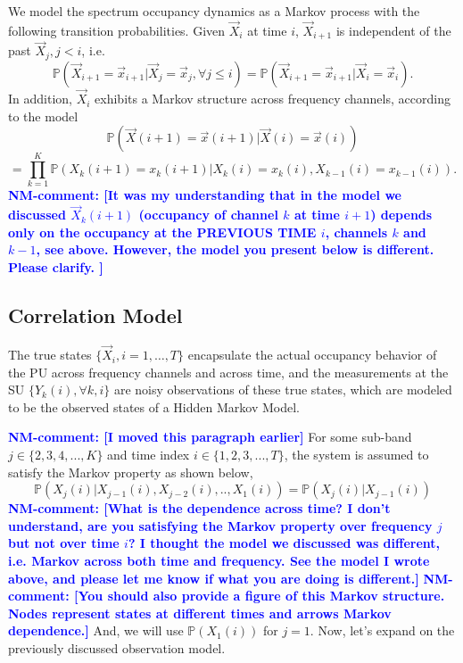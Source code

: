 \documentclass[conference]{IEEEtran}
\newcommand{\nm}[1]{\textcolor{blue}{\textbf{NM-comment: [#1]}}}
\newcommand{\add}[1]{{\color{red}#1}}
\begin{document}
\add{We model the spectrum occupancy dynamics as a Markov process with the following transition probabilities. Given $\vec{X}_i$ at time $i$, $\vec{X}_{i+1}$ is independent of the past $\vec{X}_j,j<i$, i.e.
$$\mathbb P(\vec{X}_{i+1}=\vec{x}_{i+1}|\vec{X}_{j}=\vec{x}_{j},\forall j\leq i)
=
\mathbb P(\vec{X}_{i+1}=\vec{x}_{i+1}|\vec{X}_{i}=\vec{x}_{i}).
$$
In addition, $\vec{X}_{i}$ exhibits a Markov structure across frequency channels, according to the model
$$\mathbb P(\vec X(i+1)=\vec x(i+1)|\vec X(i)=\vec x(i))
$$$$
=
\prod_{k=1}^K\mathbb P(X_k(i+1)=x_k(i+1)|X_k(i)=x_k(i),X_{k-1}(i)=x_{k-1}(i)).
$$
}
\nm{It was my understanding that in the model we discussed $\vec{X}_{k}(i+1)$
(occupancy of channel $k$ at time $i+1$) depends only on the occupancy at the PREVIOUS TIME $i$, channels $k$ and $k-1$, see above. However, the model you present below is different. Please clarify.
}

\subsection{Correlation Model}
The true states \add{$\{\vec{X}_i,i=1,\dots,T\}$} encapsulate the actual occupancy behavior of the PU \add{across frequency channels and across time,} and the measurements at the SU $\{Y_k(i),\forall k,i\}$ are noisy observations of these true states, which are modeled to be the observed states of a Hidden Markov Model.

\nm{I moved this paragraph earlier}
For some sub-band $j\in\{2,3,4,...,K\}$ and time index $i\in\{1,2,3,...,T\}$, the system is assumed to satisfy the Markov property as shown below,
\[\mathbb P(X_{j}(i)|X_{j-1}(i),X_{j-2}(i),..,X_1(i))=\mathbb P(X_{j}(i)|X_{j-1}(i))\]
\nm{What is the dependence across time? I don't understand, are you satisfying the Markov property over frequency $j$ but not over time $i$? I thought the model we discussed was different, i.e. Markov across both time and frequency. See the model I wrote above, and please let me know if what you are doing is different.}
\nm{You should also provide a figure of this Markov structure. Nodes represent states at different times and arrows Markov dependence.}
And, we will use $\mathbb P(X_1(i))$ for $j=1$. 
Now, let's expand on the previously discussed observation model.
\end{document}
